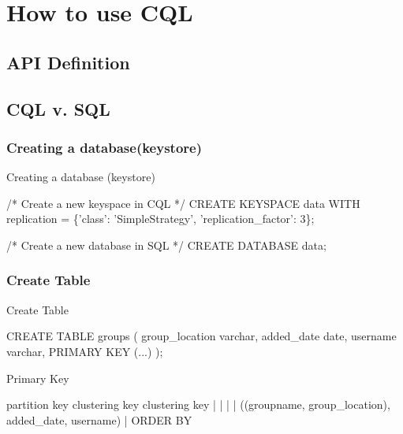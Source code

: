 \documentclass[
  10pt
]{beamer}
\begin{document}
\section{How to use CQL}  %

\subsection{API Definition}
\subsection{CQL v. SQL}
\subsubsection{Creating a database(keystore)}
\begin{frame}[fragile]{Creating a database (keystore) \cite{cqlAlexMeng}} %
  \begin{semiverbatim}
/* Create a new keyspace in CQL */
CREATE KEYSPACE data WITH replication =
\{'class': 'SimpleStrategy', 'replication_factor': 3\};

/* Create a new database in SQL */
CREATE DATABASE data;
  \end{semiverbatim}
\end{frame}

\subsubsection{Create Table}

\begin{frame}[fragile]{Create Table \cite{cqlAlexMeng, newInCQL3}}
  \begin{semiverbatim}
CREATE TABLE groups (
   group_location varchar,
   added_date date,
   username varchar,
   PRIMARY KEY (...)
);
  \end{semiverbatim}
\end{frame}

\begin{frame}[fragile]{Primary Key \cite{cqlPrimaryKeyDefinition}}
  \begin{semiverbatim}
      partition key       clustering key  clustering key
       |       |                |            |
((groupname, group_location), added_date, username)
                                |
                            ORDER BY
  \end{semiverbatim}
\end{frame}
\end{document}
